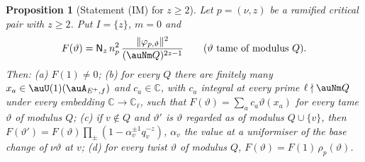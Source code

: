 \documentclass[10pt]{amsart}
\newtheorem{proposition}[theorem]{Proposition}
\theoremstyle{definition}
\theoremstyle{remark}
\newcommand{\C}{\mathbb C}
\begin{document}
\begin{proposition}[Statement (IM) for $z\ge2$]\label{pex:IM}
Let $p=(\nu,z)$ be a ramified critical pair with $z\ge2$. Put $I=\{z\}$, $m=0$ and
\[
F(\vartheta)=\mathsf N_z\,n_p^2\,\frac{\|\varphi_{p,\vartheta}\|^2}{(\auNm Q)^{2z-1}}\qquad
(\vartheta\text{ tame of modulus }Q).
\]
Then: (a) $F(1)\ne0$; (b) for every $Q$ there are finitely many $x_a\in\auU(1)(\auA_{E^+,f})$ and
$c_a\in\C$, with $c_a$ integral at every prime $\ell\nmid\auNm Q$ under every embedding $\C\to\C_\ell$,
such that $F(\vartheta)=\sum_ac_a\vartheta(x_a)$ for every tame $\vartheta$ of modulus $Q$; (c) if $v\notin Q$ and $\vartheta'$ is
$\vartheta$ regarded as of modulus $Q\cup\{v\}$, then $F(\vartheta')=F(\vartheta)\prod_\pm(1-\alpha_v^{\pm1}
q_v^{-z})$, $\alpha_v$ the value at a uniformiser of the base change of $\nu\vartheta$ at $v$; (d) for
every twist $\vartheta$ of modulus $Q$, $F(\vartheta)=F(1)\,\rho_p(\vartheta)$.
\end{proposition}
\end{document}
